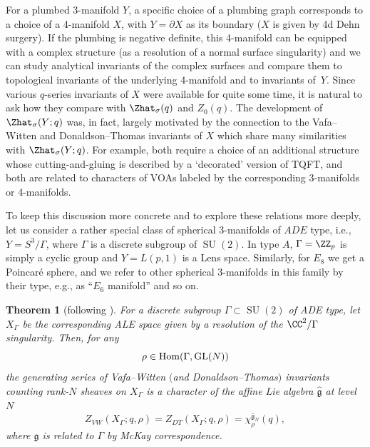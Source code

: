 \documentclass[10pt,a4paper]{amsart}
\newtheorem{Theorem}{Theorem}[section]
\begin{document}
For a plumbed 3-manifold $Y$, a specific choice of a plumbing graph corresponds to a choice of a 4-manifold $X$, with $Y = \partial X$ as its boundary ($X$ is given by 4d Dehn surgery). If the plumbing is negative definite, this 4-manifold can be equipped with a complex structure (as a resolution of a normal surface singularity) and we can study analytical invariants of the complex surfaces and compare them to topological invariants of the underlying 4-manifold and to invariants of~$Y$. Since various $q$-series invariants of $X$ were available for quite some time, it is natural to ask how they compare with $\Zhat_{\sigma} (q)$ and $Z_0 (q)$. The development of $\Zhat_{\sigma} (Y;q)$ was, in fact, largely motivated \cite{GPV16} by the connection to the Vafa--Witten and Donaldson--Thomas invariants of $X$ which share many similarities with $\Zhat_{\sigma} (Y;q)$. For example, both require a choice of an additional structure whose cutting-and-gluing is described by a `decorated' version of TQFT, and both are related to characters of VOAs labeled by the corresponding 3-manifolds or 4-manifolds.

To keep this discussion more concrete and to explore these relations more deeply, let us consider a rather special class of spherical 3-manifolds of $ADE$ type, i.e., $Y = S^3 / \Gamma$, where $\Gamma$ is a discrete subgroup of $\operatorname{SU}(2)$. In type $A$, $\Gamma = \ZZ_p$ is simply a cyclic group and $Y = L(p, 1)$ is a Lens space. Similarly, for $E_8$ we get a Poincar\'e sphere, and we refer to other spherical 3-manifolds in this family by their type, e.g., as ``$E_6$ manifold'' and so on.

\begin{Theorem}[following \cite{Nak94}]\label{theorem:ALE}
	For a discrete subgroup $\Gamma \subset \operatorname{SU}(2)$ of ADE type, let $X_{\Gamma}$ be the corresponding ALE space given by a resolution of the $\CC^2 / \Gamma$ singularity. Then, for any
\[\rho \in \operatorname{Hom} ( \Gamma , {\rm GL}(N) )
\]
	the generating series of Vafa--Witten $($and Donaldson--Thomas$)$ invariants counting rank-$N$ sheaves on $X_{\Gamma}$ is a character of the affine Lie algebra $\widehat{\mathfrak{g}}$ at level $N$
	\[
		Z_{VW} (X_{\Gamma}; q, \rho) =
		Z_{DT} (X_{\Gamma}; q, \rho) =
		\chi_{\rho}^{\widehat{\mathfrak{g}}_N} (q),
	\]
	where $\mathfrak{g}$ is related to $\Gamma$ by McKay correspondence.
\end{Theorem}
\end{document}
